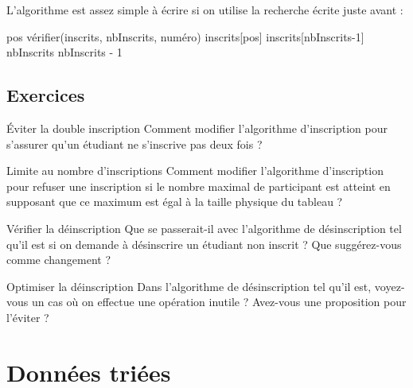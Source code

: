 			L'algorithme est assez simple à écrire
			si on utilise la recherche écrite juste avant :
			
			\begin{LDA}
					\Let pos \Gets vérifier(inscrits, nbInscrits, numéro)
					\Let inscrits[pos] \Gets inscrits[nbInscrits-1]
					\Let nbInscrits \Gets nbInscrits - 1					
				\EndAlgo
			\end{LDA}
			
		\subsection{Exercices}
			
			\begin{Exercice}{Éviter la double inscription}
				Comment modifier l'algorithme d'inscription
				pour s'assurer qu'un étudiant ne s'inscrive pas deux fois ?
			\end{Exercice}

			\begin{Exercice}{Limite au nombre d'inscriptions}
				Comment modifier l'algorithme d'inscription
				pour refuser une inscription si le nombre maximal
				de participant est atteint
				en supposant que ce maximum est égal à la taille physique du tableau ?
			\end{Exercice}

			\begin{Exercice}{Vérifier la déinscription}
				Que se passerait-il avec l'algorithme
				de désinscription tel qu'il est
				si on demande à désinscrire un étudiant non inscrit ?
				Que suggérez-vous comme changement ?
			\end{Exercice}

			\begin{Exercice}{Optimiser la déinscription}
				Dans l'algorithme de désinscription tel qu'il est,
				voyez-vous un cas où on effectue une opération inutile ?
				Avez-vous une proposition pour l'éviter ?
			\end{Exercice}

	\section{Données triées} 

